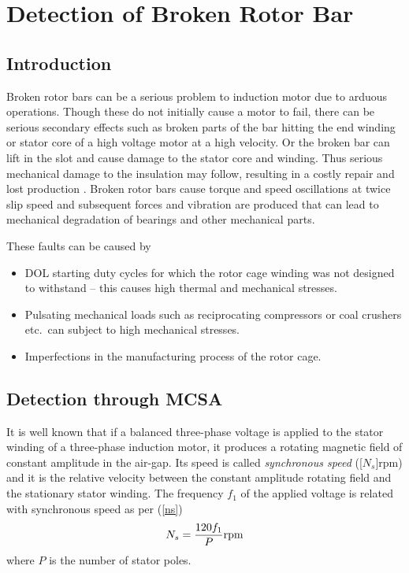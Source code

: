 \documentclass[a4paper,11pt]{report}
\begin{document}

\chapter{Detection of Broken Rotor Bar}
\section{Introduction}
Broken rotor bars can be a serious problem to induction motor due to arduous operations. Though these do not initially cause a motor to fail, there can be serious secondary effects such as broken parts of the bar hitting the end winding or stator core of a high voltage motor at a high velocity. Or the broken bar can lift in the slot and cause damage to the stator core and winding. Thus serious mechanical damage to the insulation may follow, resulting in a costly repair and lost production \cite{t32pg145}. Broken rotor bars cause torque and speed oscillations at twice slip speed and subsequent forces and vibration are produced that can lead to mechanical degradation of bearings and other mechanical parts.

These faults can be caused by
\begin{itemize}
\item DOL starting duty cycles for which the rotor cage winding was not designed to withstand -- this causes high thermal and mechanical stresses. 
\item Pulsating mechanical loads such as reciprocating compressors or coal crushers etc.~can subject to high mechanical stresses.
\item Imperfections in the manufacturing process of the rotor cage.
\end{itemize}

\section{Detection through MCSA}
It is well known that if a balanced three-phase voltage is applied to the stator winding of a three-phase induction motor, it produces a rotating magnetic field of constant amplitude in the air-gap. Its speed is called \emph{synchronous speed} (\unit[$N_{s}$]{rpm}) and it is the relative velocity between the constant amplitude rotating field and the stationary stator winding. The frequency $f_{1}$ of the applied voltage is related with synchronous speed as per (\ref{ns})
\begin{equation}
N_{s} = \frac{120f_{1}}{P} \unit[]{rpm} \label{ns}
\end{equation}
where $P$ is the number of stator poles.
\end{document}
